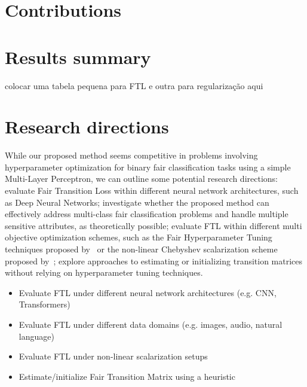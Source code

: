 \section{Contributions}

\section{Results summary}

colocar uma tabela pequena para FTL e outra para regularização aqui

\section{Research directions}

While our proposed method seems competitive in problems involving hyperparameter optimization for binary fair classification tasks using a simple Multi-Layer Perceptron, we can outline some potential research directions: evaluate Fair Transition Loss within different neural network architectures, such as Deep Neural Networks; investigate whether the proposed method can effectively address multi-class fair classification problems and handle multiple sensitive attributes, as theoretically possible; evaluate FTL within different multi objective optimization schemes, such as the Fair Hyperparameter Tuning techniques proposed by~\cite{Cruz2021} or the non-linear Chebyshev scalarization scheme proposed by~\cite{Wei2022}; explore approaches to estimating or initializing transition matrices without relying on hyperparameter tuning techniques. 
\begin{itemize}
    \item Evaluate FTL under different neural network architectures (e.g. CNN, Transformers) 
    \item Evaluate FTL under different data domains (e.g. images, audio, natural language)
    \item Evaluate FTL under non-linear scalarization setups
    \item Estimate/initialize Fair Transition Matrix using a heuristic
\end{itemize}